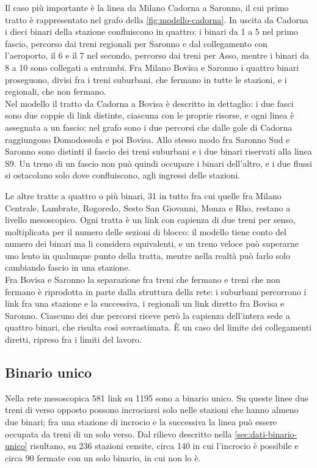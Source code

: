 Il caso più importante è la linea da Milano Cadorna a Saronno, il cui primo tratto è rappresentato nel grafo della \cref{fig:modello-cadorna}. In uscita da Cadorna i dieci binari della stazione confluiscono in quattro: i binari da 1 a 5 nel primo fascio, percorso dai treni regionali per Saronno e dal collegamento con l'aeroporto, il 6 e il 7 nel secondo, percorso dai treni per Asso, mentre i binari da 8 a 10 sono collegati a entrambi. Fra Milano Bovisa e Saronno i quattro binari proseguono, divisi fra i treni suburbani, che fermano in tutte le stazioni, e i regionali, che non fermano. \\
Nel modello il tratto da Cadorna a Bovisa è descritto in dettaglio: i due fasci sono due coppie di link distinte, ciascuna con le proprie risorse, e ogni linea è assegnata a un fascio: nel grafo sono i due percorsi che dalle gole di Cadorna raggiungono Domodossola e poi Bovisa. Allo stesso modo fra Saronno Sud e Saronno sono distinti il fascio dei treni suburbani e i due binari riservati alla linea S9. Un treno di un fascio non può quindi occupare i binari dell'altro, e i due flussi si ostacolano solo dove confluiscono, agli ingressi delle stazioni.

Le altre tratte a quattro o più binari, 31 in tutto fra cui quelle fra Milano Centrale, Lambrate, Rogoredo, Sesto San Giovanni, Monza e Rho, restano a livello mesoscopico. Ogni tratta è un link con capienza di due treni per senso, moltiplicata per il numero delle sezioni di blocco: il modello tiene conto del numero dei binari ma li considera equivalenti, e un treno veloce può superarne uno lento in qualunque punto della tratta, mentre nella realtà può farlo solo cambiando fascio in una stazione. \\
Fra Bovisa e Saronno la separazione fra treni che fermano e treni che non fermano è riprodotta in parte dalla struttura della rete: i suburbani percorrono i link fra una stazione e la successiva, i regionali un link diretto fra Bovisa e Saronno. Ciascuno dei due percorsi riceve però la capienza dell'intera sede a quattro binari, che risulta così sovrastimata. È un caso del limite dei collegamenti diretti, ripreso fra i limiti del lavoro.

\subsection{Binario unico}
Nella rete mesoscopica 581 link su 1195 sono a binario unico. Su queste linee due treni di verso opposto possono incrociarsi solo nelle stazioni che hanno almeno due binari; fra una stazione di incrocio e la successiva la linea può essere occupata da treni di un solo verso. Dal rilievo descritto nella \cref{sec:dati-binario-unico} risultano, su 236 stazioni censite, circa 140 in cui l'incrocio è possibile e circa 90 fermate con un solo binario, in cui non lo è.


